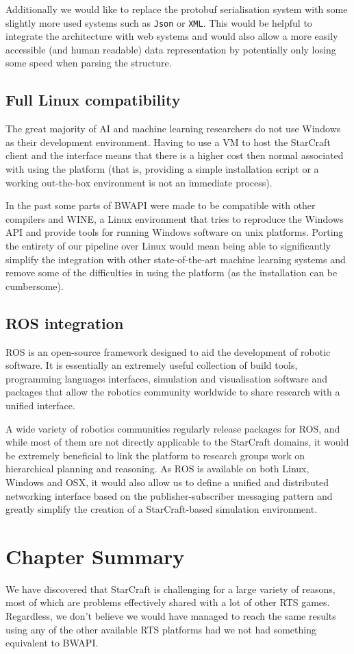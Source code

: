 Additionally we would like to replace the protobuf serialisation system with
some slightly more used systems such as \texttt{Json} or \texttt{XML}. This
would be helpful to integrate the architecture with web systems and would also
allow a more easily accessible (and human readable) data representation by
potentially only losing some speed when parsing the structure.

\subsection{Full Linux compatibility}

The great majority of AI and machine learning researchers do not use Windows as
their development environment. Having to use a VM to host the StarCraft client
and the interface means that there is a higher cost then normal associated with
using the platform (that is, providing a simple installation script or a working
out-the-box environment is not an immediate process).

In the past some parts of BWAPI were made to be compatible with other compilers
and WINE, a Linux environment that tries to reproduce the Windows API and
provide tools for running Windows software on unix platforms. Porting the
entirety of our pipeline over Linux would mean being able to significantly
simplify the integration with other state-of-the-art machine learning systems
and remove some of the difficulties in using the platform (as the installation
can be cumbersome). 


\subsection{ROS integration}

ROS is an open-source framework designed to aid the development of robotic
software. It is essentially an extremely useful collection of build tools,
programming languages interfaces, simulation and visualisation software and
packages that allow the robotics community worldwide to share research with a
unified interface.

A wide variety of robotics communities regularly release packages for ROS, and
while most of them are not directly applicable to the StarCraft domains, it
would be extremely beneficial to link the platform to research groups work on
hierarchical planning and reasoning. As ROS is available on both Linux, Windows
and OSX, it would also allow us to define a unified and distributed networking
interface based on the publisher-subscriber messaging pattern and greatly
simplify the creation of a StarCraft-based simulation environment.


\section{Chapter Summary}

We have discovered that StarCraft is challenging for a large variety of reasons,
most of which are problems effectively shared with a lot of other RTS games.
Regardless, we don't believe we would have managed to reach the same results
using any of the other available RTS platforms had we not had something
equivalent to BWAPI.
 